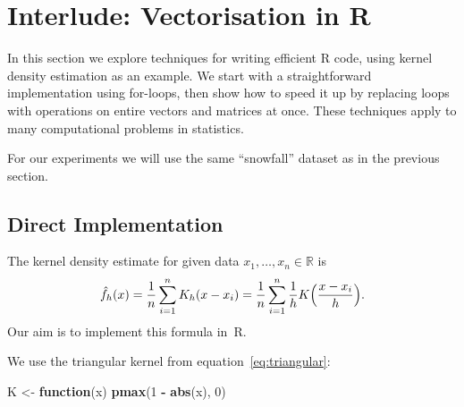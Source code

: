 \documentclass[
  a4paper,
]{article}
\newenvironment{Shaded}{\begin{snugshade}}{\end{snugshade}}
\newcommand{\CommentTok}[1]{\textcolor[rgb]{0.56,0.35,0.01}{\textit{#1}}}
\newcommand{\ControlFlowTok}[1]{\textcolor[rgb]{0.13,0.29,0.53}{\textbf{#1}}}
\newcommand{\DecValTok}[1]{\textcolor[rgb]{0.00,0.00,0.81}{#1}}
\newcommand{\FunctionTok}[1]{\textcolor[rgb]{0.13,0.29,0.53}{\textbf{#1}}}
\newcommand{\NormalTok}[1]{#1}
\newcommand{\OtherTok}[1]{\textcolor[rgb]{0.56,0.35,0.01}{#1}}
\newcommand{\SpecialCharTok}[1]{\textcolor[rgb]{0.81,0.36,0.00}{\textbf{#1}}}
\newcommand{\StringTok}[1]{\textcolor[rgb]{0.31,0.60,0.02}{#1}}
\theoremstyle{definition}
\theoremstyle{definition}
\theoremstyle{definition}
\theoremstyle{definition}
\theoremstyle{remark}
\begin{document}
\clearpage

\section*{Interlude: Vectorisation in R}\label{I01-vectorise}

In this section we explore techniques for writing efficient R code, using kernel
density estimation as an example. We start with a straightforward implementation
using for-loops, then show how to speed it up by replacing loops with operations
on entire vectors and matrices at once. These techniques apply to many
computational problems in statistics.

For our experiments we will use the same ``snowfall'' dataset as in the
previous section.

\begin{Shaded}
\end{Shaded}

\subsection*{Direct Implementation}\label{direct-implementation}

The kernel density estimate for given data \(x_1, \ldots, x_n \in\mathbb{R}\)
is
\begin{equation*}
  \hat f_h(x)
  = \frac{1}{n} \sum_{i=1}^n K_h(x - x_i)
  = \frac{1}{n} \sum_{i=1}^n \frac{1}{h} K\Bigl( \frac{x - x_i}{h} \Bigr).
\end{equation*}
Our aim is to implement this formula in~R.

We use the triangular kernel from equation~\eqref{eq:triangular}:

\begin{Shaded}
\begin{Highlighting}[]
\NormalTok{K }\OtherTok{\textless{}{-}} \ControlFlowTok{function}\NormalTok{(x) }\FunctionTok{pmax}\NormalTok{(}\DecValTok{1} \SpecialCharTok{{-}} \FunctionTok{abs}\NormalTok{(x), }\DecValTok{0}\NormalTok{)}
\end{Highlighting}
\end{Shaded}
\end{document}
